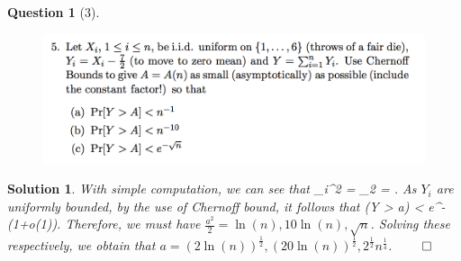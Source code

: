 \documentclass{article} %
\def\eQb#1\eQe{\begin{eqnarray*}#1\end{eqnarray*}}
\theoremstyle{quest}
\newtheorem*{question}{Question}
\newtheorem*{solution}{Solution}
\begin{document}
\begin{question}[3]
\hfill
\begin{figure}[h!]
  \centering
    \includegraphics[width=1\textwidth]{PM-4-3.png}
\end{figure}
\end{question}
\begin{solution}
With simple computation, we can see that
\eQb
\sigma_i^2 =  \>  \> \sigma_2 = .
\eQe
As $Y_i$ are uniformly bounded, by the use of Chernoff bound, it follows that
\eQb
P(Y > a\sigma ) < e^{-(1+o(1))}.
\eQe
Therefore, we must have $\frac{a^2}{2} = \ln(n), 10\ln(n) , \sqrt{n}$. Solving these respectively,
we obtain that $a = (2\ln(n))^{\frac{1}{2}}, (20\ln(n))^{\frac{1}{2}}, 2^{\frac{1}{2}} n^{\frac{1}{4}}$.
\hfill $\qed$ 
\end{solution}
\end{document}

